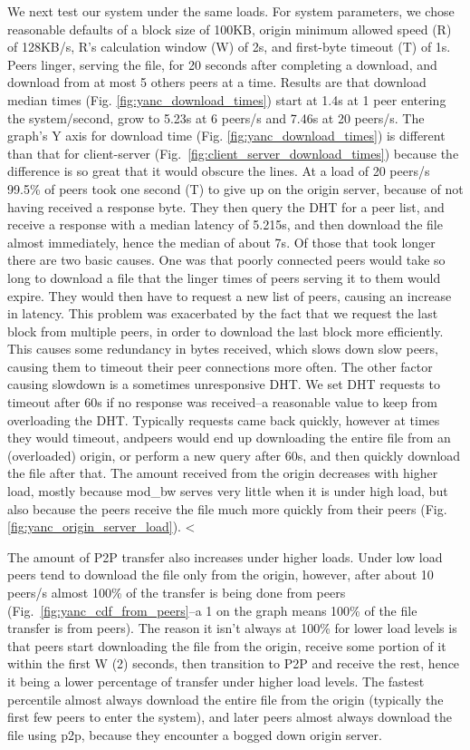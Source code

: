 We next test our system under the same loads. For system parameters, we chose reasonable defaults 
of a block size of 100KB, origin minimum allowed speed (R) of 128KB/s, R's calculation window (W) 
of 2s, and first-byte timeout (T) of 1s. Peers linger, serving the file, for 20 seconds after completing 
a download, and download from at most 5 others peers at a time. Results are that download median times 
(Fig. \ref{fig:yanc_download_times}) start at 1.4s at 1 peer entering the system/second, grow 
to 5.23s at 6 peers/s and 7.46s at 20 peers/s. The graph's Y axis for download time (Fig. \ref{fig:yanc_download_times}) 
is different than that for client-server (Fig.~\ref{fig:client_server_download_times}) 
because the difference is so great that it would obscure the lines. At a load of 20 peers/s 99.5\% 
of peers took one second (T) to give up on the origin server, because of not having received a response 
byte. They then query the DHT for a peer list, and receive a response with a median latency of 5.215s, 
and then download the file almost immediately, hence the median of about 7s. Of those that took longer 
there are two basic causes. One was that poorly connected peers would take so long to download a file 
that the linger times of peers serving it to them would expire. They would then have to request a new 
list of peers, causing an increase in latency. This problem was exacerbated by the fact that we request 
the last block from multiple peers, in order to download the last block more efficiently. This causes 
some redundancy in bytes received, which slows down slow peers, causing them to timeout their peer 
connections more often. The other factor causing slowdown is a sometimes unresponsive DHT. We 
set DHT requests to timeout after 60s if no response was received--a reasonable value to keep from 
overloading the DHT. Typically requests came back quickly, however at times they would timeout, 
andpeers would end up downloading the entire file from an (overloaded) origin, or perform a new 
query after 60s, and then quickly download the file after that. 
The amount received from the origin decreases with higher load, mostly because mod\_bw serves 
very little when it is under high load, but also because the peers receive the file much more quickly 
from their peers (Fig. \ref{fig:yanc_origin_server_load}). 
<%

The amount of P2P transfer also increases under higher loads. Under low load peers tend to download 
the file only from the origin, however, after about 10 peers/s almost 100\% of the transfer is being 
done from peers (Fig.~\ref{fig:yanc_cdf_from_peers}--a 1 on the graph means 100\% of the file 
transfer is from peers). The reason it isn't always at 100\% for lower load levels is that peers start 
downloading the file from the origin, receive some portion of it within the first W (2) seconds, 
then transition to P2P and receive the rest, hence it being a lower percentage of transfer under 
higher load levels. The fastest percentile almost always download the entire file from the origin 
(typically the first few peers to enter the system), and later peers almost always download the 
file using p2p, because they encounter a bogged down origin server. 
